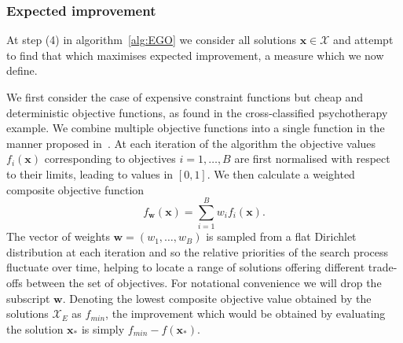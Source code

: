 \documentclass{article} %
\begin{document}
\subsubsection{Expected improvement}\label{sec:EGO}

At step (4) in algorithm~\ref{alg:EGO} we consider all solutions $\mathbf{x} \in \mathcal{X}$ and attempt to find that which maximises expected improvement, a measure which we now define. 


We first consider the case of expensive constraint functions but cheap and deterministic objective functions, as found in the cross-classified psychotherapy example. We combine multiple objective functions into a single function in the manner proposed in~\cite{Knowles2006}. At each iteration of the algorithm the objective values $f_{i}(\mathbf{x})$ corresponding to objectives $i = 1, \ldots , B$ are first normalised with respect to their limits, leading to values in $[0,1]$. We then calculate a weighted composite objective function
\begin{equation}
f_{\mathbf{w}}(\mathbf{x}) = \sum_{i=1}^{B}w_{i}f_{i}(\mathbf{x}).
\end{equation}\label{eqn:composite}
The vector of weights $\mathbf{w} = (w_{1}, \ldots , w_{B})$ is sampled from a flat Dirichlet distribution at each iteration and so the relative priorities of the search process fluctuate over time, helping to locate a range of solutions offering different trade-offs between the set of objectives. For notational convenience we will drop the subscript $\mathbf{w}$. Denoting the lowest composite objective value obtained by the solutions $\mathcal{X}_{E}$ as $f_{min}$, the improvement which would be obtained by evaluating the solution $\mathbf{x}_{*}$ is simply $f_{min} - f(\mathbf{x}_{*})$.
\end{document}
